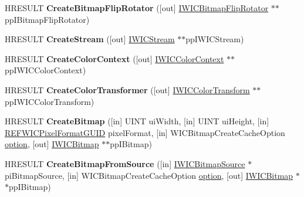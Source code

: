 \begin{DoxyCompactItemize}
\item 
\mbox{\label{interface_i_w_i_c_imaging_factory_a7845b35c8018b8be2a39529292b85558}} 
H\+R\+E\+S\+U\+LT {\bfseries Create\+Bitmap\+Flip\+Rotator} (\mbox{[}out\mbox{]} \hyperlink{interface_i_w_i_c_bitmap_flip_rotator}{I\+W\+I\+C\+Bitmap\+Flip\+Rotator} $\ast$$\ast$pp\+I\+Bitmap\+Flip\+Rotator)
\item 
\mbox{\label{interface_i_w_i_c_imaging_factory_abebc5550a4360a0dc8dee6826aa38120}} 
H\+R\+E\+S\+U\+LT {\bfseries Create\+Stream} (\mbox{[}out\mbox{]} \hyperlink{interface_i_w_i_c_stream}{I\+W\+I\+C\+Stream} $\ast$$\ast$pp\+I\+W\+I\+C\+Stream)
\item 
\mbox{\label{interface_i_w_i_c_imaging_factory_a807eed178fefb6b4b768f1675fde4c14}} 
H\+R\+E\+S\+U\+LT {\bfseries Create\+Color\+Context} (\mbox{[}out\mbox{]} \hyperlink{interface_i_w_i_c_color_context}{I\+W\+I\+C\+Color\+Context} $\ast$$\ast$pp\+I\+W\+I\+C\+Color\+Context)
\item 
\mbox{\label{interface_i_w_i_c_imaging_factory_af7855fdd710df5a14765173684b0f308}} 
H\+R\+E\+S\+U\+LT {\bfseries Create\+Color\+Transformer} (\mbox{[}out\mbox{]} \hyperlink{interface_i_w_i_c_color_transform}{I\+W\+I\+C\+Color\+Transform} $\ast$$\ast$pp\+I\+W\+I\+C\+Color\+Transform)
\item 
\mbox{\label{interface_i_w_i_c_imaging_factory_a44c68d75f8893a2525bc4c88096871b1}} 
H\+R\+E\+S\+U\+LT {\bfseries Create\+Bitmap} (\mbox{[}in\mbox{]} U\+I\+NT ui\+Width, \mbox{[}in\mbox{]} U\+I\+NT ui\+Height, \mbox{[}in\mbox{]} \hyperlink{struct___g_u_i_d}{R\+E\+F\+W\+I\+C\+Pixel\+Format\+G\+U\+ID} pixel\+Format, \mbox{[}in\mbox{]} W\+I\+C\+Bitmap\+Create\+Cache\+Option \hyperlink{structoption}{option}, \mbox{[}out\mbox{]} \hyperlink{interface_i_w_i_c_bitmap}{I\+W\+I\+C\+Bitmap} $\ast$$\ast$pp\+I\+Bitmap)
\item 
\mbox{\label{interface_i_w_i_c_imaging_factory_a41879f5b8a139c22eb39cbe9184740cb}} 
H\+R\+E\+S\+U\+LT {\bfseries Create\+Bitmap\+From\+Source} (\mbox{[}in\mbox{]} \hyperlink{interface_i_w_i_c_bitmap_source}{I\+W\+I\+C\+Bitmap\+Source} $\ast$pi\+Bitmap\+Source, \mbox{[}in\mbox{]} W\+I\+C\+Bitmap\+Create\+Cache\+Option \hyperlink{structoption}{option}, \mbox{[}out\mbox{]} \hyperlink{interface_i_w_i_c_bitmap}{I\+W\+I\+C\+Bitmap} $\ast$$\ast$pp\+I\+Bitmap)

\end{DoxyCompactItemize}
